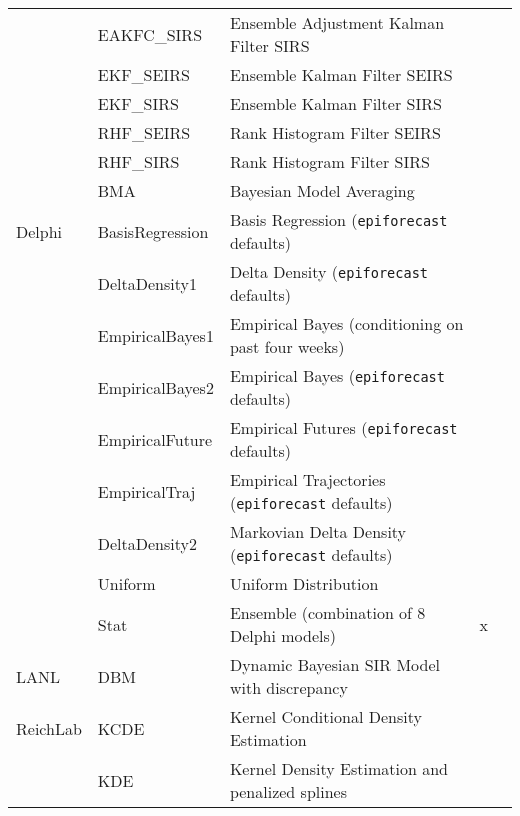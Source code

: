 \begin{table}
\begin{tabular}{p{1.6cm} l p{7.5cm} c  p{1cm}  }
~        & EAKFC\_SIRS        & Ensemble Adjustment Kalman Filter SIRS && \cite{Pei2017}   \\
~        & EKF\_SEIRS         & Ensemble Kalman Filter SEIRS && \cite{Yang2014}                   \\
~        & EKF\_SIRS          & Ensemble Kalman Filter SIRS && \cite{Yang2014}                      \\
~        & RHF\_SEIRS         & Rank Histogram Filter SEIRS && \cite{Yang2014}                    \\
~        & RHF\_SIRS          & Rank Histogram Filter SIRS && \cite{Yang2014}                   \\
~        & BMA                & Bayesian Model Averaging && \cite{Yamana2017}               \\
\hline
Delphi   & BasisRegression    & Basis Regression ({\tt epiforecast} defaults) && \cite{Brooks2015a}              \\ 
~        & DeltaDensity1      & Delta Density ({\tt epiforecast} defaults)   && \cite{Brooks2018}              \\ 
~        & EmpiricalBayes1    & Empirical Bayes (conditioning on past four weeks) && \cite{Brooks2015,Brooks2015a}        \\ 
~        & EmpiricalBayes2    & Empirical Bayes ({\tt epiforecast} defaults) && \cite{Brooks2015,Brooks2015a}      \\ 
~        & EmpiricalFuture    & Empirical Futures ({\tt epiforecast} defaults) &&  \cite{Brooks2015a}      \\ 
~        & EmpiricalTraj      & Empirical Trajectories ({\tt epiforecast} defaults)&& \cite{Brooks2015a}            \\ 
~        & DeltaDensity2      & Markovian Delta Density ({\tt epiforecast} defaults)&& \cite{Brooks2018}          \\ 
~        & Uniform            & Uniform Distribution& &     \\ 
~        & Stat               & Ensemble (combination of 8 Delphi models)& x &    \cite{Brooks2018}\\
\hline
LANL     & DBM                & Dynamic Bayesian SIR Model with discrepancy && \cite{Osthus2017}     \\ 
\hline
ReichLab & KCDE               & Kernel Conditional Density Estimation && \cite{Ray2017}    \\ 
~        & KDE                & Kernel Density Estimation and penalized splines & & \cite{Ray2018} \\ 

\end{tabular}
\end{table}
